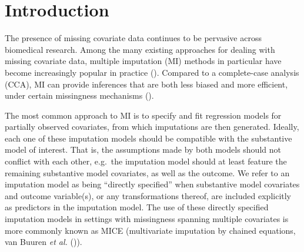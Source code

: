 \documentclass[
  letterpaper,
  paper=240mm:170mm,
  twoside=true,
  open=right,
  fontsize=10pt,
  pagesize=false,
  BCOR=15mm,
  DIV=14,
  headinclude=true,
  footinclude=false,
  headsepline=on]{scrbook}
\begin{document}
\clearpage

\section{Introduction}\label{introduction-2}

The presence of missing covariate data continues to be pervasive across
biomedical research. Among the many existing approaches for dealing with
missing covariate data, multiple imputation (MI) methods in particular
have become increasingly popular in practice
(). Compared to a complete-case analysis (CCA), MI can provide
inferences that are both less biased and more efficient, under certain
missingness mechanisms
().

The most common approach to MI is to specify and fit regression models
for partially observed covariates, from which imputations are then
generated. Ideally, each one of these imputation models should be
compatible with the substantive model of interest. That is, the
assumptions made by both models should not conflict with each other,
e.g.~the imputation model should at least feature the remaining
substantive model covariates, as well as the outcome. We refer to an
imputation model as being ``directly specified'' when substantive model
covariates and outcome variable(s), or any transformations thereof, are
included explicitly as predictors in the imputation model. The use of
these directly specified imputation models in settings with missingness
spanning multiple covariates is more commonly known as MICE
(multivariate imputation by chained equations, van Buuren \emph{et al.}
()).
\end{document}
